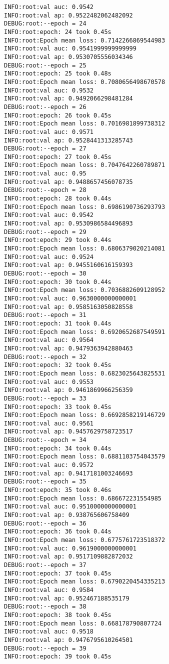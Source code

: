 \documentclass[11pt]{article}
\begin{document}
\begin{verbatim}
INFO:root:val auc: 0.9542
INFO:root:val ap: 0.9522482062482092
DEBUG:root:--epoch = 24
INFO:root:epoch: 24 took 0.45s
INFO:root:Epoch mean loss: 0.7142266869544983
INFO:root:val auc: 0.9541999999999999
INFO:root:val ap: 0.9530705556034346
DEBUG:root:--epoch = 25
INFO:root:epoch: 25 took 0.48s
INFO:root:Epoch mean loss: 0.7080656498670578
INFO:root:val auc: 0.9532
INFO:root:val ap: 0.9492066298481284
DEBUG:root:--epoch = 26
INFO:root:epoch: 26 took 0.45s
INFO:root:Epoch mean loss: 0.7016981899738312
INFO:root:val auc: 0.9571
INFO:root:val ap: 0.9528441313285743
DEBUG:root:--epoch = 27
INFO:root:epoch: 27 took 0.45s
INFO:root:Epoch mean loss: 0.7047642260789871
INFO:root:val auc: 0.95
INFO:root:val ap: 0.9488657456078735
DEBUG:root:--epoch = 28
INFO:root:epoch: 28 took 0.44s
INFO:root:Epoch mean loss: 0.6986190736293793
INFO:root:val auc: 0.9542
INFO:root:val ap: 0.9530986584496893
DEBUG:root:--epoch = 29
INFO:root:epoch: 29 took 0.44s
INFO:root:Epoch mean loss: 0.6806379020214081
INFO:root:val auc: 0.9524
INFO:root:val ap: 0.9455160616159393
DEBUG:root:--epoch = 30
INFO:root:epoch: 30 took 0.44s
INFO:root:Epoch mean loss: 0.7036882609128952
INFO:root:val auc: 0.9630000000000001
INFO:root:val ap: 0.9585163050828558
DEBUG:root:--epoch = 31
INFO:root:epoch: 31 took 0.44s
INFO:root:Epoch mean loss: 0.6920652687549591
INFO:root:val auc: 0.9564
INFO:root:val ap: 0.9479363942880463
DEBUG:root:--epoch = 32
INFO:root:epoch: 32 took 0.45s
INFO:root:Epoch mean loss: 0.6823025643825531
INFO:root:val auc: 0.9553
INFO:root:val ap: 0.9461869966256359
DEBUG:root:--epoch = 33
INFO:root:epoch: 33 took 0.45s
INFO:root:Epoch mean loss: 0.6692858219146729
INFO:root:val auc: 0.9561
INFO:root:val ap: 0.9457629758723517
DEBUG:root:--epoch = 34
INFO:root:epoch: 34 took 0.44s
INFO:root:Epoch mean loss: 0.6881103754043579
INFO:root:val auc: 0.9572
INFO:root:val ap: 0.9417181003246693
DEBUG:root:--epoch = 35
INFO:root:epoch: 35 took 0.46s
INFO:root:Epoch mean loss: 0.686672231554985
INFO:root:val auc: 0.9510000000000001
INFO:root:val ap: 0.938765606758409
DEBUG:root:--epoch = 36
INFO:root:epoch: 36 took 0.44s
INFO:root:Epoch mean loss: 0.6775761723518372
INFO:root:val auc: 0.9619000000000001
INFO:root:val ap: 0.9517109882872032
DEBUG:root:--epoch = 37
INFO:root:epoch: 37 took 0.45s
INFO:root:Epoch mean loss: 0.6790220454335213
INFO:root:val auc: 0.9584
INFO:root:val ap: 0.952467188535179
DEBUG:root:--epoch = 38
INFO:root:epoch: 38 took 0.45s
INFO:root:Epoch mean loss: 0.668178790807724
INFO:root:val auc: 0.9518
INFO:root:val ap: 0.9476795610264501
DEBUG:root:--epoch = 39
INFO:root:epoch: 39 took 0.45s

\end{verbatim}
\end{document}
